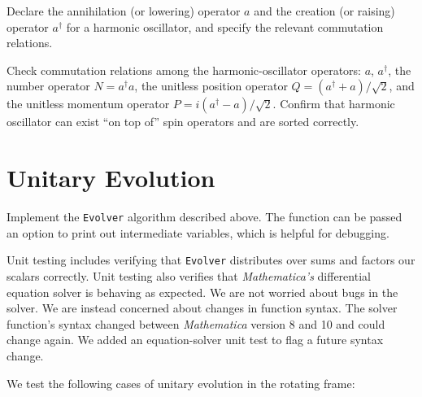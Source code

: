 \documentclass[12pt,letterpaper]{refart}
\begin{document}
Declare the annihilation (or lowering) operator $a$ and the creation (or raising) operator $a^{\dagger}$ for a harmonic oscillator, and specify the relevant commutation relations.



Check commutation relations among the harmonic-oscillator operators: $a$, $a^{\dagger}$, the number operator $N = a^{\dagger} a$, the unitless position operator $Q = (a^{\dagger} + a)/\sqrt{2}$, and the unitless momentum operator $P = i (a^{\dagger} - a)/\sqrt{2}$.
Confirm that harmonic oscillator can exist ``on top of'' spin operators and are sorted correctly.



\section{Unitary Evolution}

Implement the \verb+Evolver+ algorithm described above.
The function can be passed an option to print out intermediate variables, which is helpful for debugging.



Unit testing includes verifying that \verb+Evolver+ distributes over sums and factors our scalars correctly.
Unit testing also verifies that \emph{Mathematica's} differential equation solver is behaving as expected.
We are not worried about bugs in the solver. 
We are instead concerned about changes in function syntax.
The solver function's syntax changed between \emph{Mathematica} version 8 and 10 and could change again. 
We added an equation-solver unit test to flag a future syntax change.

We test the following cases of unitary evolution in the rotating frame:
\end{document}
